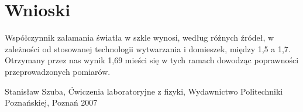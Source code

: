 \documentclass[polish,a4paper]{article}
\begin{document}
\section{Wnioski}
Współczynnik załamania światła w szkle wynosi, według różnych źródeł, w zależności od stosowanej technologii wytwarzania i domieszek, między 1,5 a 1,7. Otrzymany przez nas wynik 1,69 mieści się w tych ramach dowodząc poprawności przeprowadzonych pomiarów.

\begin{thebibliography}{1}
 Stanisław Szuba, Ćwiczenia laboratoryjne z fizyki, Wydawnictwo Politechniki Poznańskiej, Poznań 2007
\end{thebibliography}
\end{document}
